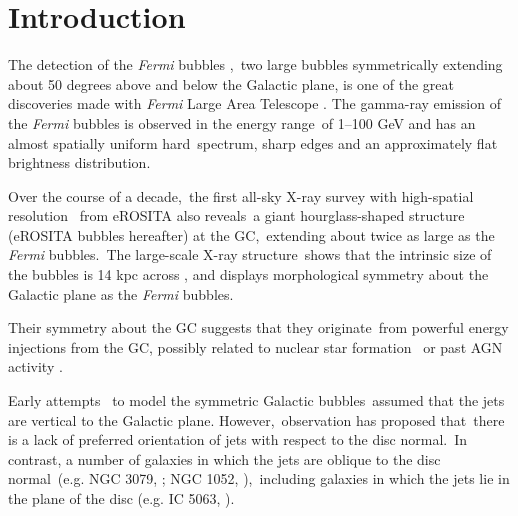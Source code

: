 \documentclass[fleqn,usenatbib,useAMS]{mnras}
\begin{document}


\begingroup
\let\clearpage\relax
\endgroup
\newpage



\section{Introduction}
The detection of the \textit{Fermi} bubbles \citep{Su2012,Ackermann2014,Narayanan2017},\
two large bubbles symmetrically extending about 50 degrees above and below the Galactic plane,
is one of the great discoveries made with \textit{Fermi} Large Area Telescope \citep{Atwood2009}.
The gamma-ray emission of the \textit{Fermi} bubbles is observed in the energy range\
of 1--100 GeV and has an almost spatially uniform hard\
spectrum, sharp edges and an approximately flat brightness distribution.\

Over the course of a decade,\
the first all-sky X-ray survey with high-spatial resolution \citep{Predehl2021}\
from eROSITA \citep{Predehl2020} also reveals\
a giant hourglass-shaped structure (eROSITA bubbles hereafter) at the GC,\
extending about twice as large as the \textit{Fermi} bubbles.\
The large-scale X-ray structure\
shows that the intrinsic size of the bubbles is 14 kpc across \citep{Predehl2021},
and displays morphological symmetry about the Galactic plane as the \textit{Fermi} bubbles.

Their symmetry about the GC suggests that they originate\
from powerful energy injections from the GC, possibly related to nuclear star formation\
\citep{PhysRevLett.106.101102,Carretti2013}
or past AGN activity \citep{Guo2012,Li,Yang2017,Zhu}.

Early attempts \citep{Sarkar2015,Yang2017,Zhang2020}\
to model the symmetric Galactic bubbles\
assumed that the jets are vertical to the Galactic plane. However,\
observation \citep{Gallimore2006} has proposed that\
there is a lack of preferred orientation of jets with respect to the disc normal.\
In contrast, a number of galaxies in which the jets are oblique to the disc normal\
(e.g. NGC 3079, \citealt{Cecil2001}; NGC 1052, \citealt{Dopita2015}),\
including galaxies in which the jets lie in the plane of the disc (e.g. IC 5063, \citealt{Morganti2015}).
\end{document}
